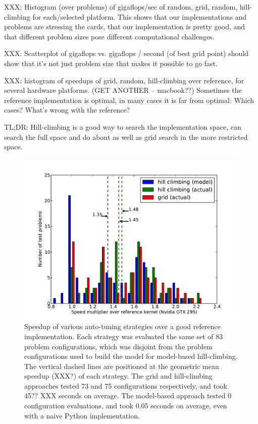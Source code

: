 \documentclass{sig-alternate}
\begin{document}
XXX: Histogram (over problems) of gigaflops/sec of random, grid, random,
hill-climbing for each/selected platform.
This shows that our implementations and problems are stressing the cards,
that our implementation is pretty good, and that different problem sizes pose
different computational challenges.

XXX: Scatterplot of gigaflops vs. gigaflops / second (of best grid point)
should show that it's not just problem size that makes it possible to go fast.


XXX: histogram of speedups of grid, random, hill-climbing over reference, for
several hardware platforms. (GET ANOTHER -- macbook??)
Sometimes the reference implementation is optimal, in many cases it is far
from optimal: Which cases? What's wrong with the reference?

TL;DR: Hill-climbing is a good way to search the implementation space, can
search the full space and do about as well as grid search in the more
restricted space.

\begin{figure}
\includegraphics[scale=.5]{speedup_295.pdf}
\caption{Speedup of various auto-tuning strategies over a good reference
implementation.
Each strategy was evaluated the same set of 83 problem configurations, which
was disjoint from the problem configurations used to build the model for
model-based hill-climbing.
The vertical dashed lines are positioned at the geometric mean speedup (XXX?)
of each strategy. The grid and hill-climbing approaches
tested 73 and 75 configurations respectively, and took 45?? XXX
seconds on average.
The model-based approach tested 0 configuration evaluations, and took 0.05
seconds on average, even with a naive Python implementation.
}
\label{fig:speedup_295}
\end{figure}
\end{document}
